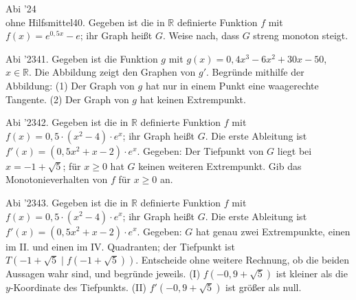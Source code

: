 \documentclass[11pt]{article}
\begin{document}
\pfgruppe{}
\begin{pfaufg}{Abi ’24\\ohne Hilfsmittel}{40.}{}
Gegeben ist die in $\mathbb{R}$ definierte Funktion $f$ mit $f(x) = e^{0{,}5x} - e$; ihr Graph heißt $G$. Weise nach, dass $G$ streng monoton steigt.
\end{pfaufg}
\begin{pfaufg}{Abi ’23}{41.}{}
Gegeben ist die Funktion $g$ mit $g(x) = 0{,}4x^3 - 6x^2 + 30x - 50$, $x \in \mathbb{R}$. Die Abbildung zeigt den Graphen von $g'$. Begründe mithilfe der Abbildung: (1) Der Graph von $g$ hat nur in einem Punkt eine waagerechte Tangente. (2) Der Graph von $g$ hat keinen Extrempunkt.
\par\smallskip\noindent {}\par
{}
\end{pfaufg}
\pfgruppe{}
\begin{pfaufg}{Abi ’23}{42.}{}
Gegeben ist die in $\mathbb{R}$ definierte Funktion $f$ mit $f(x) = 0{,}5\cdot(x^2 - 4)\cdot e^x$; ihr Graph heißt $G$. Die erste Ableitung ist $f'(x) = (0{,}5x^2 + x - 2)\cdot e^x$. Gegeben: Der Tiefpunkt von $G$ liegt bei $x = -1 + \sqrt{5}$; für $x \ge 0$ hat $G$ keinen weiteren Extrempunkt. Gib das Monotonieverhalten von $f$ für $x \ge 0$ an.
\fusshilfe{\mbox{42:~streng monoton fallend auf [0}}
\end{pfaufg}
\pfgruppe{}
\begin{pfaufg}{Abi ’23}{43.}{}
Gegeben ist die in $\mathbb{R}$ definierte Funktion $f$ mit $f(x) = 0{,}5\cdot(x^2 - 4)\cdot e^x$; ihr Graph heißt $G$. Die erste Ableitung ist $f'(x) = (0{,}5x^2 + x - 2)\cdot e^x$. Gegeben: $G$ hat genau zwei Extrempunkte, einen im II. und einen im IV. Quadranten; der Tiefpunkt ist $T(-1 + \sqrt{5} \mid f(-1 + \sqrt{5}))$. Entscheide ohne weitere Rechnung, ob die beiden Aussagen wahr sind, und begründe jeweils. (I) $f(-0{,}9 + \sqrt{5})$ ist kleiner als die $y$-Koordinate des Tiefpunkts. (II) $f'(-0{,}9 + \sqrt{5})$ ist größer als null.
\end{pfaufg}
\end{document}

